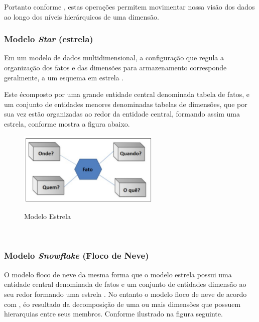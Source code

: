 Portanto conforme \cite{bi-machado-2018}, estas opera\c{c}\~{o}es permitem movimentar nossa vis\~{a}o dos dados ao longo dos n\'{i}veis hier\'{a}rquicos de uma dimens\~{a}o.

\subsubsection{Modelo \textit{Star} (estrela)}

Em um modelo de dados multidimensional, a configura\c{c}\~{a}o que regula a organiza\c{c}\~{a}o dos fatos e das dimens\~{o}es para armazenamento corresponde geralmente, a um esquema em estrela \cite{bi-machado-2018}.

Este \'{e}composto por uma grande entidade central denominada tabela de fatos, e um conjunto de entidades menores denominadas tabelas de dimens\~{o}es, que por sua vez est\~{a}o organizadas ao redor da entidade central, formando assim uma estrela, conforme mostra a figura abaixo.

\begin{figure}[H]
	\vspace*{0,2cm}
    \centering
    \caption{Modelo Estrela}
    \includegraphics[width=0.6\textwidth]{./04-figuras/figura-09}
    \label{fig:ilustfig09}
\end{figure}
\vspace*{-0,9cm}
{\raggedright {}} \\

\subsubsection{Modelo \textit{Snowflake} (Floco de Neve)}

O modelo floco de neve da mesma forma que o modelo estrela possui uma entidade central denominada de fatos e um conjunto de entidades dimens\~{a}o ao seu redor formando uma estrela
.
No entanto o modelo floco de neve de acordo com \cite{bi-machado-2018}, \'{e}o resultado da decomposi\c{c}\~{a}o de uma ou mais dimens\~{o}es que possuem hierarquias entre seus membros. Conforme ilustrado na figura seguinte.
	
